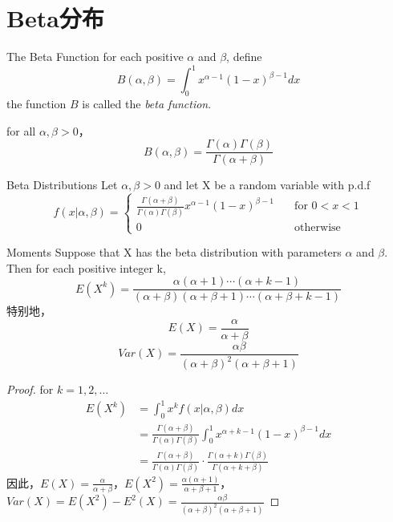 \documentclass[../main.tex]{subfiles}
\begin{document}
\section{Beta分布}
\begin{definition}{The Beta Function}{}
for each positive $\alpha$ and $\beta$, define
\begin{equation}\label{}
B(\alpha, \beta)=\int_{0}^{1} x^{\alpha-1}(1-x)^{\beta-1}dx
\end{equation}
the function $B$ is called the \textit{beta function}.
\end{definition}

\begin{theorem}{}{}
for all $\alpha, \beta > 0$，
\begin{equation}\label{}
B(\alpha, \beta)=\frac{\Gamma(\alpha)\Gamma(\beta)}{\Gamma(\alpha+\beta)}
\end{equation}
\end{theorem}


\begin{definition}{Beta Distributions}{}
Let $\alpha, \beta>0$ and let X be a random variable with p.d.f
\begin{equation}\label{}
f(x|\alpha,\beta)=\begin{cases}
\frac{\Gamma(\alpha+\beta)}{\Gamma(\alpha)\Gamma(\beta)} x^{\alpha-1}(1-x)^{\beta-1}\quad &\text{for $0<x<1$}\\
0\quad &\text{otherwise}
\end{cases}
\end{equation}
\end{definition}

\begin{theorem}{Moments}{}
Suppose that X has the beta distribution with parameters $\alpha$ and $\beta$. Then for each positive integer k,
\begin{equation}\label{}
E(X^k)=\frac{\alpha(\alpha+1)\cdots(\alpha+k-1)}{(\alpha+\beta)(\alpha+\beta+1)\cdots(\alpha+\beta+k-1)}
\end{equation}
特别地，
\begin{equation}\label{}
E(X)=\frac{\alpha}{\alpha+\beta}
\end{equation}
\begin{equation}\label{}
Var(X)=\frac{\alpha\beta}{(\alpha+\beta)^2(\alpha+\beta+1)}
\end{equation}
\end{theorem}
\begin{proof}
for $k=1, 2, \dots$
\begin{equation}\label{}
\begin{split}
E(X^k)&=\int_{0}^{1} x^kf(x|\alpha, \beta)dx\\
&=\frac{\Gamma(\alpha+\beta)}{\Gamma(\alpha)\Gamma(\beta)} \int_{0}^{1}x^{\alpha+k-1}(1-x)^{\beta-1}dx\\
&=\frac{\Gamma(\alpha+\beta)}{\Gamma(\alpha)\Gamma(\beta)} \cdot \frac{\Gamma(\alpha+k)\Gamma(\beta)}{\Gamma(\alpha+k+\beta)}
\end{split}
\end{equation}
因此，$E(X)=\frac{\alpha}{\alpha+\beta}$，$E(X^2)=\frac{\alpha(\alpha+1)}{\alpha+\beta+1}$，$Var(X)=E(X^2)-E^2(X)=\frac{\alpha\beta}{(\alpha+\beta)^2(\alpha+\beta+1)}$
\end{proof}
\end{document}
